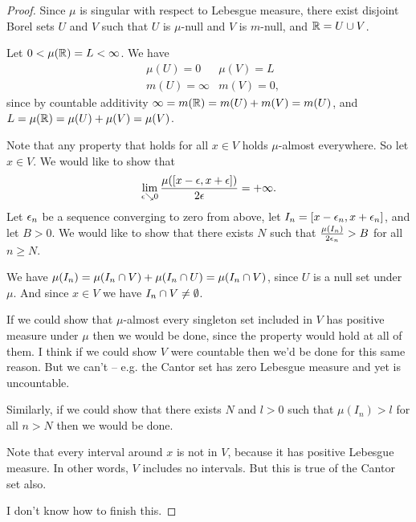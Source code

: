 \begin{proof}
  Since $\mu$ is singular with respect to Lebesgue measure, there exist disjoint Borel sets $U$ and $V$ such
  that $U$ is $\mu$-null and $V$ is $m$-null, and $\mathbb{R} = U \cup V$.

  Let $0 < \mu(\mathbb{R}) = L < \infty$. We have
  \begin{align*}
    &\mu(U) = 0     & \mu(V) = L \\
    &m(U) = \infty & m(V) = 0,
  \end{align*}
  since by countable additivity $\infty = m(\mathbb{R}) = m(U) + m(V) = m(U)$,
  and $L = \mu(\mathbb{R}) = \mu(U) + \mu(V) = \mu(V)$.

  Note that any property that holds for all $x \in V$ holds $\mu$-almost everywhere. So let $x \in V$. We would
  like to show that
  \begin{align*}
    \lim_{\eps \searrow 0} \frac{\mu([x - \eps, x + \eps])}{2\eps} = +\infty.
  \end{align*}
  Let $\epsilon_n$ be a sequence converging to zero from above, let $I_n = [x - \epsilon_n, x + \epsilon_n]$, and
  let $B > 0$. We would like to show that there exists $N$ such that $\frac{\mu(I_n)}{2\epsilon_n} > B$ for
  all $n \geq N$.

  We have $\mu(I_n) = \mu(I_n \cap V) + \mu(I_n \cap U) = \mu(I_n \cap V)$, since $U$ is a null set
  under $\mu$. And since $x \in V$ we have $I_n \cap V \neq \emptyset$.

  If we could show that $\mu$-almost every singleton set included in $V$ has positive measure under $\mu$ then
  we would be done, since the property would hold at all of them. I think if we could show $V$ were countable
  then we'd be done for this same reason. But we can't -- e.g. the Cantor set has zero Lebesgue measure and yet
  is uncountable.

  Similarly, if we could show that there exists $N$ and $l > 0$ such that $\mu(I_n) > l$ for all $n > N$ then
  we would be done.

  Note that every interval around $x$ is not in $V$, because it has positive Lebesgue measure. In other
  words, $V$ includes no intervals. But this is true of the Cantor set also.

  I don't know how to finish this.
\end{proof}


